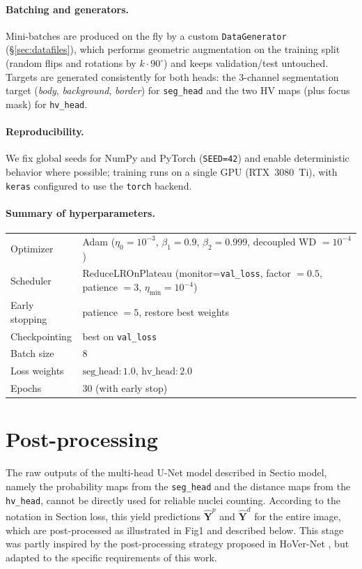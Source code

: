\documentclass[target=bach,aauheader=,style=]{thud}
\begin{document}
\paragraph{Batching and generators.}
Mini-batches are produced on the fly by a custom \texttt{DataGenerator} (\S\ref{sec:datafiles}), which performs geometric augmentation on the training split (random flips and rotations by $k\cdot 90^\circ$) and keeps validation/test untouched. Targets are generated consistently for both heads: the 3-channel segmentation target (\emph{body}, \emph{background}, \emph{border}) for \texttt{seg\_head} and the two HV maps (plus focus mask) for \texttt{hv\_head}.

\paragraph{Reproducibility.}
We fix global seeds for NumPy and PyTorch (\texttt{SEED=42}) and enable deterministic behavior where possible; training runs on a single GPU (RTX~3080~Ti), with \texttt{keras} configured to use the \texttt{torch} backend.

\paragraph{Summary of hyperparameters.}
\begin{center}
\begin{tabular}{l l}
\hline
Optimizer & Adam ($\eta_0{=}10^{-3}$, $\beta_1{=}0.9$, $\beta_2{=}0.999$, decoupled WD $=10^{-4}$) \\
Scheduler & ReduceLROnPlateau (monitor=\texttt{val\_loss}, factor $=0.5$, patience $=3$, $\eta_{\min}{=}10^{-4}$) \\
Early stopping & patience $=5$, restore best weights \\
Checkpointing & best on \texttt{val\_loss} \\
Batch size & $8$ \\
Loss weights & $\text{seg\_head}:1.0$, $\text{hv\_head}:2.0$ \\
Epochs & $30$ (with early stop) \\
\hline
\end{tabular}
\end{center}
\section{Post-processing}
\label{sec:postprocessing}

The raw outputs of the multi-head U-Net model described in Sectio model, namely the probability maps from the \texttt{seg\_head} and the distance maps from the \texttt{hv\_head}, cannot be directly used for reliable nuclei counting. 
According to the notation in Section loss, this yield predictions $\widehat{\mathbf{Y}}^p$ and $\widehat{\mathbf{Y}}^d$ for the entire image, which are post-processed as illustrated in Fig1 and described below. 
This stage was partly inspired by the post-processing strategy proposed in HoVer-Net \cite{graham2019hovernet}, but adapted to the specific requirements of this work.
\end{document}
